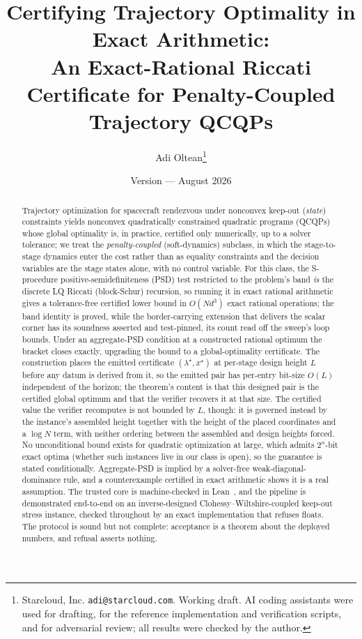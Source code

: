 \documentclass[11pt]{article}
\title{Certifying Trajectory Optimality in Exact Arithmetic:\\
An Exact-Rational Riccati Certificate for Penalty-Coupled Trajectory QCQPs}
\author{Adi Oltean\thanks{Starcloud, Inc. \texttt{adi@starcloud.com}. Working draft.
AI coding assistants were used for drafting, for the reference implementation and
verification scripts, and for adversarial review; all results were checked by the author.}}
\date{Version \paperversion{} --- August 2026}
\theoremstyle{definition}
\theoremstyle{remark}
\renewcommand{\_}{\ifdim\fontdimen3\font=0pt\relax\char`\_\else\textunderscore\fi\hspace{0pt}}
\begin{document}
\maketitle

\begin{abstract}
Trajectory optimization for spacecraft rendezvous under nonconvex keep-out
(\emph{state}) constraints yields nonconvex quadratically constrained quadratic
programs (QCQPs) whose global optimality is, in practice, certified only
numerically, up to a solver tolerance; we treat the \emph{penalty-coupled}
(soft-dynamics) subclass, in which the stage-to-stage dynamics enter the cost
rather than as equality constraints and the decision variables are the stage
states alone, with no control variable. For this class, the S-procedure
positive-semidefiniteness (PSD) test restricted to the problem's band \emph{is}
the discrete LQ Riccati (block-Schur) recursion, so running it in exact rational
arithmetic gives a tolerance-free certified lower bound in $O(Nd^3)$ exact
rational operations; the band identity is proved, while the border-carrying
extension that delivers the scalar corner has its soundness asserted and
test-pinned, its count
read off the sweep's loop bounds. Under an aggregate-PSD condition at a
constructed rational optimum the bracket closes exactly, upgrading the bound to
a global-optimality certificate. The construction places the emitted certificate
$(\lambda^\star,x^\star)$ at per-stage design height $L$ before any datum is
derived from it, so the emitted pair has per-entry bit-size $O(L)$ independent
of the horizon; the theorem's content is that this designed pair is the
certified global optimum and that the verifier recovers it at that size. The
certified value the verifier recomputes is not bounded by $L$, though: it is
governed instead by the instance's assembled height together with the height of
the placed coordinates and a $\log N$ term, with neither ordering between the
assembled and design heights forced. No unconditional bound exists for quadratic
optimization at large, which admits $2^n$-bit exact optima (whether such
instances live in our class is open), so the guarantee is
stated conditionally. Aggregate-PSD is implied by a solver-free
weak-diagonal-dominance rule, and a counterexample certified in exact
arithmetic shows it is a real assumption. The trusted core is machine-checked in
Lean~\cite{leannote}, and the pipeline is demonstrated end-to-end on an
inverse-designed Clohessy--Wiltshire-coupled keep-out stress instance, checked
throughout by an exact implementation that refuses floats. The protocol is
sound but not complete: acceptance is a theorem about the deployed numbers,
and refusal asserts nothing.
\end{abstract}
\end{document}
